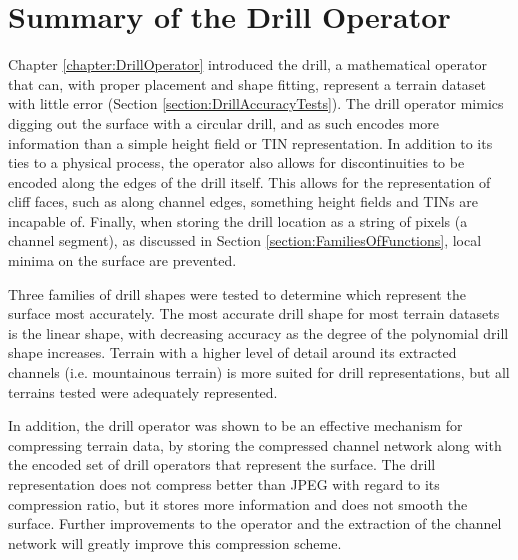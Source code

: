 % 
% 
% 
% 


\section{Summary of the Drill Operator}
\label{section:FutureWorkDrillOperator}

Chapter \ref{chapter:DrillOperator} introduced the drill, a mathematical operator that can, with proper placement and shape fitting, represent a terrain dataset with little error (Section \ref{section:DrillAccuracyTests}). 
The drill operator mimics digging out the surface with a circular drill, and as such encodes more information than a simple height field or TIN representation. In addition to its ties to a physical process, the operator also allows for discontinuities to be encoded along the edges of the drill itself. This allows for the representation of cliff faces, such as along channel edges, something height fields and TINs are incapable of. Finally, when storing the drill location as a string of pixels (a channel segment), as discussed in Section \ref{section:FamiliesOfFunctions}, local minima on the surface are prevented.

Three families of drill shapes were tested to determine which represent the surface most accurately. The most accurate drill shape for most terrain datasets is the linear shape, with decreasing accuracy as the degree of the polynomial drill shape increases. Terrain with a higher level of detail around its extracted channels (i.e. mountainous terrain) is more suited for drill representations, but all terrains tested were adequately represented.

In addition, the drill operator was shown to be an effective mechanism for compressing terrain data, by storing the compressed channel network along with the encoded set of drill operators that represent the surface. The drill representation does not compress better than JPEG with regard to its compression ratio, but it stores more information and does not smooth the surface. Further improvements to the operator and the extraction of the channel network will greatly improve this compression scheme.

